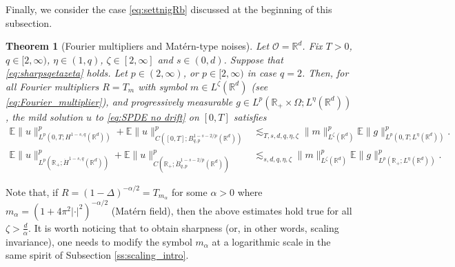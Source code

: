 \documentclass[reqno]{amsart}
\theoremstyle{plain}
\newtheorem{theorem}{Theorem}[section]
\theoremstyle{remark}
\theoremstyle{plain}
\numberwithin{equation}{section}
\newcommand\cO{\mathcal{O}}
\def\R{{\mathbb R}}
\newcommand{\E}{{\mathbb E}}
\renewcommand{\O}{\Omega}
\newcommand{\1}{\one}
\begin{document}
\smallskip

Finally, we consider the case \eqref{eq:settnigRb} discussed at the beginning of this subsection. 

\begin{theorem}[Fourier multipliers and Mat\'ern-type noises]\label{thm:heatMatern}
Let $\cO = \R^d$.
Fix $T>0$, $q\in [2, \infty)$, $\eta\in (1, q)$, $\zeta\in [2, \infty]$ and $s\in(0,d)$.
Suppose that \eqref{eq:sharpsqetazeta} holds.
Let $p\in (2,\infty)$, or $p\in [2,\infty)$ in case $q=2$.
Then, for all Fourier multipliers $R=T_m$ with symbol $m\in L^\zeta(\R^d)$ (see \eqref{eq:Fourier_multiplier}), and progressively measurable $g\in L^p(\R_+\times \O;L^\eta(\R^d))$, the mild solution $u$ to \eqref{eq:SPDE no drift} on $[0,T]$ satisfies
\begin{align}
  \E\|u\|_{L^p(0,T;H^{1-s,q}(\R^d))}^p
  + \E\|u\|_{C([0,T];B^{1-s-2/p}_{q,p}(\R^d))}^p
&    \lesssim_{T,s,d,q,\eta,\zeta}\|m\|_{L^\zeta(\R^d)}^{p}
   \E\|g\|_{L^{p}(0,T;L^\eta(\R^d))}^p.
\\   \E\|u\|_{L^p(\R_+;\dot{H}^{1-s,q}(\R^d))}^p
  + \E\|u\|_{C(\R_+;\dot{B}^{1-s-2/p}_{q,p}(\R^d))}^p
    & \lesssim_{s,d,q,\eta,\zeta} \|m\|_{L^\zeta(\R^d)}^{p}
   \E\|g\|_{L^{p}(\R_+;L^\eta(\R^d))}^p.
\end{align}
\end{theorem}

Note that, if $R=(1-\Delta)^{-\alpha/2}=T_{m_\alpha}$ for some $\alpha>0$ where $m_\alpha=(1+4\pi^2|\cdot|^2)^{-\alpha/2}$ (Mat\'ern field), then the above estimates hold true for 
all $\zeta>\frac{d}{\alpha}$.
It is worth noticing that to obtain sharpness (or, in other words, scaling invariance), one needs to modify the symbol $m_\alpha$ at a logarithmic scale in the same spirit of Subsection \ref{ss:scaling_intro}.
\end{document}
